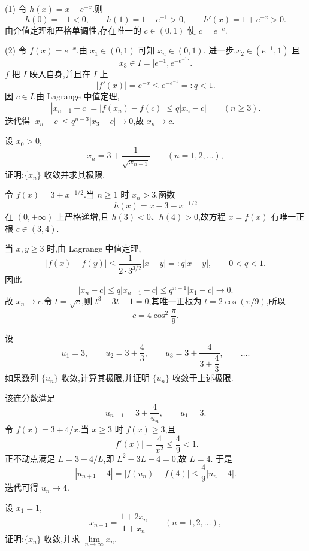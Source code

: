 \begin{solution}
  (1) 令 $h(x)=x-e^{-x}$.则
  \[
    h(0)=-1<0,
    \qquad h(1)=1-e^{-1}>0,
    \qquad h'(x)=1+e^{-x}>0.
  \]
  由介值定理和严格单调性,存在唯一的 $c\in(0,1)$ 使 $c=e^{-c}$.

  (2) 令 $f(x)=e^{-x}$.由 $x_1\in(0,1)$ 可知 $x_n\in(0,1)$.
  进一步,$x_2\in(e^{-1},1)$ 且
  \[
    x_3\in I=\lbrack e^{-1},e^{-e^{-1}}\rbrack.
  \]
  $f$ 把 $I$ 映入自身,并且在 $I$ 上
  \[
    |f'(x)|=e^{-x}\leq e^{-e^{-1}}=:q<1.
  \]
  因 $c\in I$,由 Lagrange 中值定理,
  \[
    |x_{n+1}-c|=|f(x_n)-f(c)|\leq q|x_n-c|
    \qquad(n\geq3).
  \]
  迭代得 $|x_n-c|\leq q^{n-3}|x_3-c|\to0$,故 $x_n\to c$.
\end{solution}

\begin{example}
  设 $x_0>0$,
  \[
    x_n=3+\dfrac{1}{\sqrt{x_{n-1}}}\qquad(n=1,2,\ldots),
  \]
  证明:$\{x_n\}$ 收敛并求其极限.
\end{example}
\exampleblank

\begin{solution}
  令 $f(x)=3+x^{-1/2}$.当 $n\geq1$ 时 $x_n>3$.函数
  \[
    h(x)=x-3-x^{-1/2}
  \]
  在 $(0,+\infty)$ 上严格递增,且 $h(3)<0$、$h(4)>0$,故方程
  $x=f(x)$ 有唯一正根 $c\in(3,4)$.

  当 $x,y\geq3$ 时,由 Lagrange 中值定理,
  \[
    |f(x)-f(y)|\leq\dfrac{1}{2\cdot3^{3/2}}|x-y|=:q|x-y|,
    \qquad 0<q<1.
  \]
  因此
  \[
    |x_n-c|\leq q|x_{n-1}-c|\leq q^{n-1}|x_1-c|\longrightarrow0.
  \]
  故 $x_n\to c$.令 $t=\sqrt c$,则 $t^3-3t-1=0$;其唯一正根为
  $t=2\cos(\pi/9)$,所以
  \[
    c=4\cos^2\dfrac{\pi}{9}.
  \]
\end{solution}

\begin{example}
  设
  \[
    u_1=3,
    \qquad
    u_2=3+\dfrac{4}{3},
    \qquad
    u_3=3+\dfrac{4}{3+\dfrac{4}{3}},
    \qquad\ldots.
  \]
  如果数列 $\{u_n\}$ 收敛,计算其极限,并证明 $\{u_n\}$ 收敛于上述极限.
\end{example}
\exampleblank

\begin{solution}
  该连分数满足
  \[
    u_{n+1}=3+\dfrac{4}{u_n},
    \qquad u_1=3.
  \]
  令 $f(x)=3+4/x$.当 $x\geq3$ 时 $f(x)\geq3$,且
  \[
    |f'(x)|=\dfrac{4}{x^2}\leq\dfrac{4}{9}<1.
  \]
  正不动点满足 $L=3+4/L$,即 $L^2-3L-4=0$,故 $L=4$.
  于是
  \[
    |u_{n+1}-4|=|f(u_n)-f(4)|\leq\dfrac{4}{9}|u_n-4|.
  \]
  迭代可得 $u_n\to4$.
\end{solution}

\begin{example}
  设 $x_1=1$,
  \[
    x_{n+1}=\dfrac{1+2x_n}{1+x_n}\qquad(n=1,2,\ldots),
  \]
  证明:$\{x_n\}$ 收敛,并求 $\displaystyle \lim\limits_{n\to\infty}x_n$.
\end{example}
\exampleblank

